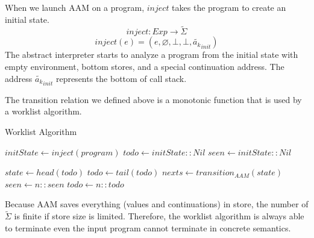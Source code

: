 \documentclass{article}
\begin{document}
When we launch AAM on a program, $inject$ takes the program to create an initial state.
\[
inject : Exp \to \tilde{\Sigma}
\]
\[
inject(e) = (e, \varnothing, \bot, \bot, \tilde{a_k}_{init})
\]
The abstract interpreter starts to analyze a program from the initial state with empty environment, bottom stores, and a special continuation address.
The address $\tilde{a_k}_{init}$ represents the bottom of call stack.

The transition relation we defined above is a monotonic function that is used by a worklist algorithm.
\begin{algorithm}
\caption{Worklist Algorithm}\label{euclid}
\begin{algorithmic}[1]
\State $\textit{initState} \gets inject(program)$
\State $\textit{todo} \gets \textit{initState} :: Nil$
\State $\textit{seen} \gets \textit{initState} :: Nil$

  \State $\textit{state} \gets head(\textit{todo})$
  \State $\textit{todo} \gets tail(\textit{todo})$
  \State $\textit{nexts} \gets transition_{AAM}(\textit{state})$
      \State $\textit{seen} \gets \textit{n} :: \textit{seen}$
      \State $\textit{todo} \gets \textit{n} :: \textit{todo}$
    \EndIf
  \EndFor
\EndWhile
\end{algorithmic}
\end{algorithm}
Because AAM saves everything (values and continuations) in store, the number of $\tilde{\Sigma}$ is finite if store size is limited.
Therefore, the worklist algorithm is always able to terminate even the input program cannot terminate in concrete semantics.
\end{document}
